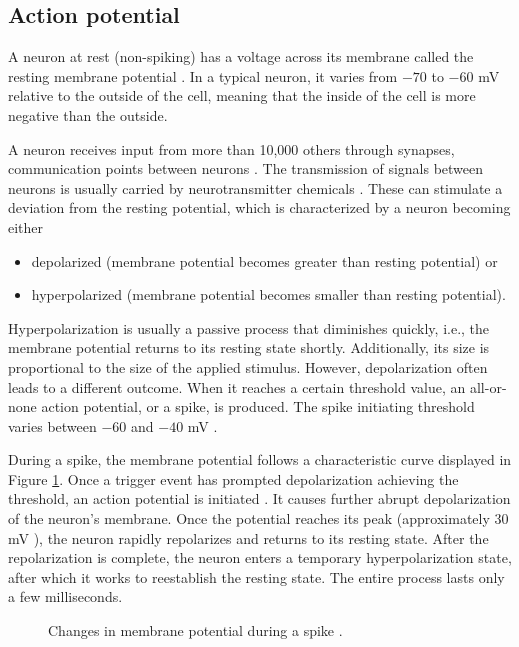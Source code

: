 \subsection{Action potential}
\label{sec:action-potential}

A neuron at rest (non-spiking) has a voltage across its membrane called the resting membrane potential \cite{KandelBook2003:6}. In a typical neuron, it varies from $-70$ to $-60$ mV relative to the outside of the cell, meaning that the inside of the cell is more negative than the outside.

A neuron receives input from more than 10,000 others through synapses, communication points between neurons \cite{IzhikevichBook2004:2}. The transmission of signals between neurons is usually carried by neurotransmitter chemicals \cite{KandelBook2003:6}. 
 These can stimulate a deviation from the resting potential, which is characterized by a neuron becoming either
\begin{itemize}
    \item depolarized (membrane potential becomes greater than resting potential) or
    
    \item hyperpolarized (membrane potential becomes smaller than resting potential).
\end{itemize}

Hyperpolarization is usually a passive process that diminishes quickly, i.e., the membrane potential returns to its resting state shortly. 
Additionally, its size is proportional to the size of the applied stimulus. However, depolarization often leads to a different outcome. When it reaches a certain threshold value, an all-or-none action potential, or a spike, is produced. The spike initiating threshold varies between $-60$ and $-40$ mV \cite{Platkiewicz2010}. 

During a spike, the membrane potential follows a characteristic curve displayed in Figure \ref{fig:action-potential}. Once a trigger event has prompted depolarization achieving the threshold, an action potential is initiated \cite{KandelBook2003:7}. It causes further abrupt depolarization of the neuron's membrane. Once the potential reaches its peak (approximately $30$ mV \cite{Izhikevich2003}), the neuron rapidly repolarizes and returns to its resting state. After the repolarization is complete, the neuron enters a temporary hyperpolarization state, after which it works to reestablish the resting state. The entire process lasts only a few milliseconds.

\begin{figure}
    \centering
    
    \caption[Changes in membrane potential during a spike]{Changes in membrane potential during a spike \cite{ClarkBook2018:35.2}.}
    \label{fig:action-potential}
\end{figure}
